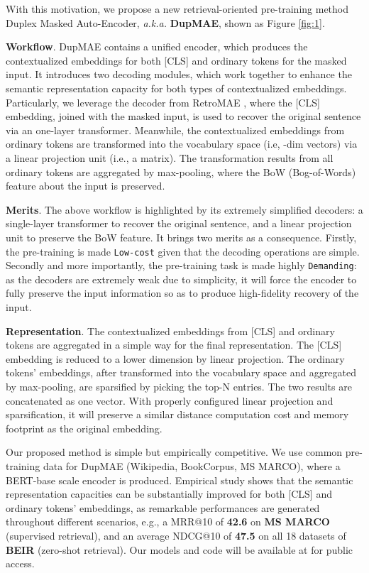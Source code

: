 \documentclass[11pt,a4paper]{article}
\begin{document}
With this motivation, we propose a new retrieval-oriented pre-training method Duplex Masked Auto-Encoder, \textit{a.k.a.} \textbf{DupMAE}, shown as Figure \ref{fig:1}.  

 \textbf{Workflow}. DupMAE contains a unified encoder, which produces the contextualized embeddings for both [CLS] and ordinary tokens for the masked input. It introduces two decoding modules, which work together to enhance the semantic representation capacity for both types of contextualized embeddings. Particularly, we leverage the decoder from RetroMAE \cite{liu2022retromae}, where the [CLS] embedding, joined with the masked input, is used to recover the original sentence via an one-layer transformer. Meanwhile, the contextualized embeddings from ordinary tokens are transformed into the vocabulary space (i.e, -dim vectors) via a linear projection unit (i.e., a  matrix). The transformation results from all ordinary tokens are aggregated by max-pooling, where the BoW (Bog-of-Words) feature about the input is preserved.  

 \textbf{Merits}. The above workflow is highlighted by its {extremely} {simplified} decoders: a single-layer transformer to recover the original sentence, and a linear projection unit to preserve the BoW feature. It brings two merits as a consequence. Firstly, the pre-training is made \texttt{Low-cost} given that the decoding operations are simple. Secondly and more importantly, the pre-training task is made highly \texttt{Demanding}: as the decoders are extremely weak due to simplicity, it will force the encoder to fully preserve the input information so as to produce high-fidelity recovery of the input. 



 \textbf{Representation}. The contextualized embeddings from [CLS] and ordinary tokens are aggregated in a simple way for the final representation. The [CLS] embedding is reduced to a lower dimension by linear projection. The ordinary tokens' embeddings, after transformed into the vocabulary space and aggregated by max-pooling, are sparsified by picking the top-N entries. The two results are concatenated as one vector. With properly configured linear projection and sparsification, it will preserve a similar distance computation cost and memory footprint as the original embedding.  

Our proposed method is simple but empirically competitive. We use common pre-training data for DupMAE (Wikipedia, BookCorpus, MS MARCO), where a BERT-base scale encoder is produced. 
Empirical study shows that the semantic representation capacities can be substantially improved for both [CLS] and ordinary tokens' embeddings, as remarkable performances are generated throughout different scenarios, e.g., a MRR@10 of \textbf{42.6} on \textbf{MS MARCO} (supervised retrieval), and an average NDCG@10 of \textbf{47.5} on all 18 datasets of \textbf{BEIR} (zero-shot retrieval). Our models and code will be available at \cite{retromae-code} for public access.  
\end{document}
